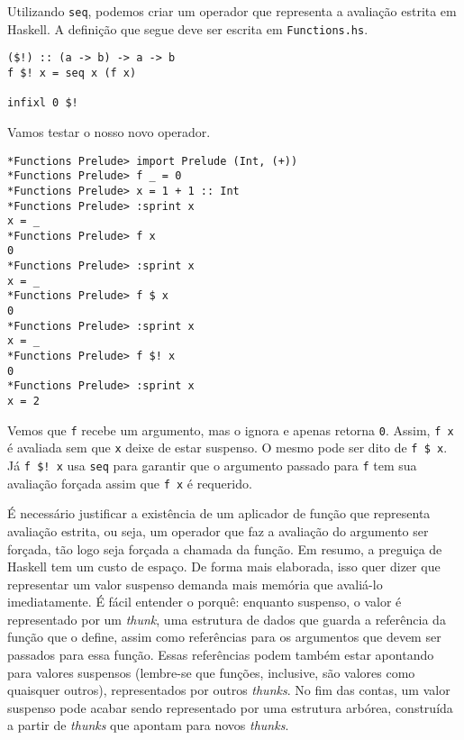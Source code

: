 \documentclass[a4paper]{article}
\begin{document}
Utilizando \texttt{seq}, podemos criar um operador que representa a avaliação estrita em Haskell.
A definição que segue deve ser escrita em \texttt{Functions.hs}.

\begin{verbatim}
($!) :: (a -> b) -> a -> b
f $! x = seq x (f x)

infixl 0 $!
\end{verbatim}

Vamos testar o nosso novo operador.

\begin{verbatim}
*Functions Prelude> import Prelude (Int, (+))
*Functions Prelude> f _ = 0
*Functions Prelude> x = 1 + 1 :: Int
*Functions Prelude> :sprint x
x = _
*Functions Prelude> f x
0
*Functions Prelude> :sprint x
x = _
*Functions Prelude> f $ x
0
*Functions Prelude> :sprint x
x = _
*Functions Prelude> f $! x
0
*Functions Prelude> :sprint x
x = 2
\end{verbatim}

Vemos que \texttt{f} recebe um argumento, mas o ignora e apenas retorna \texttt{0}.
Assim, \texttt{f x} é avaliada sem que \texttt{x} deixe de estar suspenso.
O mesmo pode ser dito de \texttt{f \$ x}.
Já \texttt{f \$! x} usa \texttt{seq} para garantir que o argumento passado para \texttt{f} tem sua avaliação forçada assim que \texttt{f x} é requerido.

É necessário justificar a existência de um aplicador de função que representa avaliação estrita, ou seja, um operador que faz a avaliação do argumento ser forçada, tão logo seja forçada a chamada da função.
Em resumo, a preguiça de Haskell tem um custo de espaço.
De forma mais elaborada, isso quer dizer que representar um valor suspenso demanda mais memória que avaliá-lo imediatamente.
É fácil entender o porquê: enquanto suspenso, o valor é representado por um \emph{thunk}, uma estrutura de dados que guarda a referência da função que o define, assim como referências para os argumentos que devem ser passados para essa função.
Essas referências podem também estar apontando para valores suspensos (lembre-se que funções, inclusive, são valores como quaisquer outros), representados por outros \emph{thunks}.
No fim das contas, um valor suspenso pode acabar sendo representado por uma estrutura arbórea, construída a partir de \emph{thunks} que apontam para novos \emph{thunks}.
\end{document}
